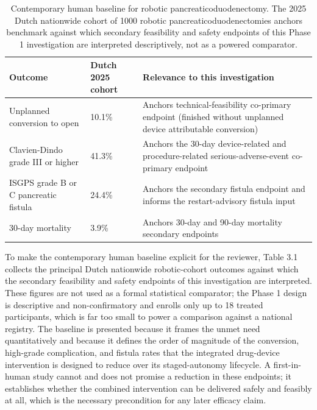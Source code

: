 \begin{table}[t]
\caption{Contemporary human baseline for robotic pancreaticoduodenectomy. The 2025
Dutch nationwide cohort of 1000 robotic pancreaticoduodenectomies anchors
benchmark against which secondary feasibility and safety endpoints of this
Phase 1 investigation are interpreted descriptively, not as a powered comparator.}
\label{tab:sec02-baseline}
\centering
\begin{tabularx}{\textwidth}{L{2.95cm} C{2.4cm} Y}
\toprule
\textbf{Outcome} & \textbf{Dutch 2025 cohort} & \textbf{Relevance to this investigation} \\
\midrule
Unplanned conversion to open & 10.1\% & Anchors technical-feasibility co-primary endpoint (finished without unplanned device attributable conversion) \\
Clavien-Dindo grade III or higher & 41.3\% & Anchors the 30-day device-related and procedure-related serious-adverse-event co-primary endpoint \\
ISGPS grade B or C pancreatic fistula & 24.4\% & Anchors the secondary fistula endpoint and informs the restart-advisory fistula input \\
30-day mortality & 3.9\% & Anchors 30-day and 90-day mortality secondary endpoints \\
\bottomrule
\end{tabularx}
\end{table}
\vspace*{-1.4cm}

To make the contemporary human baseline explicit for the reviewer, Table 3.1
collects the principal Dutch nationwide robotic-cohort outcomes against which the
secondary feasibility and safety endpoints of this investigation are interpreted.
These figures are not used as a formal statistical comparator; the Phase 1 design
is descriptive and non-confirmatory and enrolls only up to 18 treated participants,
which is far too small to power a comparison against a national registry. The
baseline is presented because it frames the unmet need quantitatively and because
it defines the order of magnitude of the conversion, high-grade complication, and
fistula rates that the integrated drug-device intervention is designed to reduce
over its staged-autonomy lifecycle. A first-in-human study cannot and does not
promise a reduction in these endpoints; it establishes whether the combined
intervention can be delivered safely and feasibly at all, which is the necessary
precondition for any later efficacy claim.

